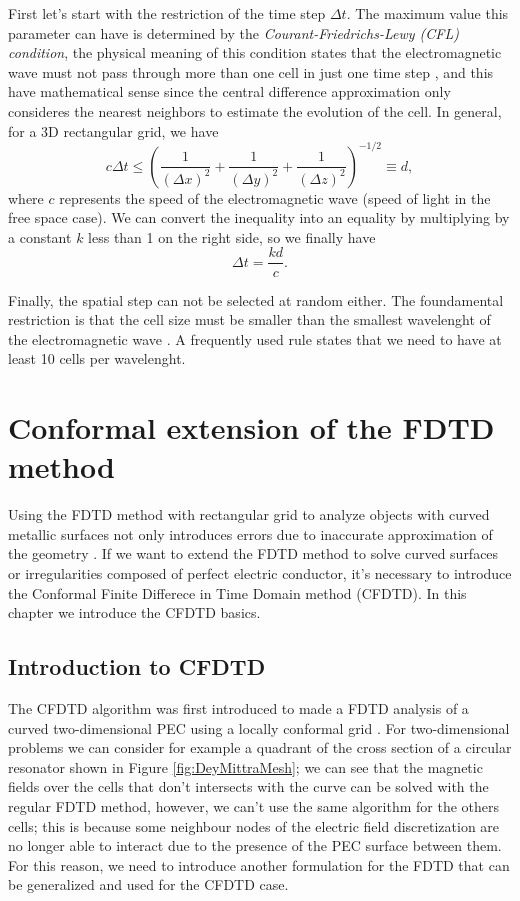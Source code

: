 \documentclass[12pt, oneside]{book}
\begin{document}
\indent First let's start with the restriction of the time step $\Delta t$. The maximum value this parameter can have is determined by the \textit{Courant-Friedrichs-Lewy (CFL) condition}, the physical meaning of this condition states that the electromagnetic wave must not pass through more than one cell in just one time step \cite{kunz1993finite}, and this have mathematical sense since the central difference approximation only consideres the nearest neighbors to estimate the evolution of the cell. In general, for a 3D rectangular grid, we have
\begin{equation}
    c \Delta t \leq \left( \dfrac{1}{(\Delta x)^2} + \dfrac{1}{(\Delta y)^2} + \dfrac{1}{(\Delta z)^2} \right)^{-1/2} \equiv d,
\end{equation}
where $c$ represents the speed of the electromagnetic wave (speed of light in the free space case). We can convert the inequality into an equality by multiplying by a constant $k$ less than 1 on the right side, so we finally have
\begin{equation}
    \Delta t = \dfrac{kd}{c}.
    \label{eq:CFL}
\end{equation}

Finally, the spatial step can not be selected at random either. The foundamental restriction is that the cell size must be smaller than the smallest wavelenght of the electromagnetic wave \cite{kunz1993finite}. A frequently used rule states that we need to have at least 10 cells per wavelenght.

\chapter{Conformal extension of the FDTD method}

Using the FDTD method with rectangular grid to analyze objects with curved metallic surfaces not only introduces errors due to inaccurate approximation of the geometry \cite{97384}. If we want to extend the FDTD method to solve curved surfaces or irregularities composed of perfect electric conductor, it's necessary to introduce the Conformal Finite Differece in Time Domain method (CFDTD). In this chapter we introduce the CFDTD basics.

\section{Introduction to CFDTD}

The CFDTD algorithm was first introduced to made a FDTD analysis of a curved two-dimensional PEC using a locally conformal grid \cite{DeyMittra1997}. For two-dimensional problems we can consider for example a quadrant of the cross section of a circular resonator shown in Figure \ref{fig:DeyMittraMesh}; we can see that the magnetic fields over the cells that don't intersects with the curve can be solved with the regular FDTD method, however, we can't use the same algorithm for the others cells; this is because some neighbour nodes of the electric field discretization are no longer able to interact due to the presence of the PEC surface between them. For this reason, we need to introduce another formulation for the FDTD that can be generalized and used for the CFDTD case.
\end{document}

